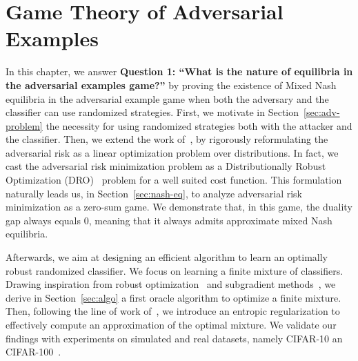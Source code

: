 \chapter{Game Theory of Adversarial Examples}
\label{chap:game}
\minitoc

In this chapter, we answer \textbf{Question 1: ``What is the nature of equilibria in the adversarial examples game?''} by proving the existence of Mixed Nash equilibria in the adversarial example game when both the adversary and the classifier can use randomized strategies. First, we motivate in Section~\ref{sec:adv-problem} the necessity for using randomized strategies both with the attacker and the classifier. Then, we extend the work of~\cite{pydi2019adversarial}, by rigorously reformulating the adversarial risk as a linear optimization problem over distributions. In fact, we cast the adversarial risk minimization problem as a Distributionally Robust Optimization (DRO)~\citep{blanchet2019quantifying} problem for a well suited cost function. This formulation naturally leads us, in Section~\ref{sec:nash-eq}, to analyze adversarial risk minimization as a zero-sum game. We demonstrate that, in this game, the duality gap always equals $0$, meaning that it always admits approximate mixed Nash equilibria.  

Afterwards, we aim at designing an efficient algorithm to learn an optimally robust randomized classifier.
We focus on learning a finite mixture of classifiers. Drawing inspiration from robust optimization~\cite{sinha2017certifying} and subgradient methods~\cite{boyd2003subgradient}, we derive in Section~\ref{sec:algo} a first oracle algorithm to optimize a finite mixture. Then, following the line of work of~\citep{cuturi2013sinkhorn}, we introduce an entropic regularization to effectively compute an approximation of the optimal mixture. We validate our findings with experiments on simulated and real  datasets, namely CIFAR-10 an CIFAR-100~\cite{krizhevsky2009learning}.









